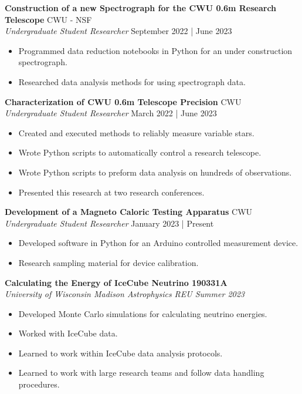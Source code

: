 \documentclass[a4paper,9pt]{extarticle}
\begin{document}
\noindent
\textbf{Construction of a new Spectrograph for the CWU 0.6m Research Telescope} \hfill CWU - NSF\\
\textit{Undergraduate Student Researcher}
\hfill September 2022 | June 2023
\begin{itemize}
    \item Programmed data reduction notebooks in Python for an under construction spectrograph.
    \item Researched data analysis methods for using spectrograph data.
\end{itemize}

\noindent
\textbf{Characterization of CWU 0.6m Telescope Precision} \hfill CWU\\
\textit{Undergraduate Student Researcher}
\hfill March 2022 | June 2023
\begin{itemize}
    \item Created and executed methods to reliably measure variable stars.
    \item Wrote Python scripts to automatically control a research telescope.
    \item Wrote Python scripts to preform data analysis on hundreds of observations.
    \item Presented this research at two research conferences.
\end{itemize}

\noindent
\textbf{Development of a Magneto Caloric Testing Apparatus} \hfill CWU\\
\textit{Undergraduate Student Researcher}
\hfill January 2023 | Present
\begin{itemize}
    \item Developed software in Python for an Arduino controlled measurement device.
    \item Research sampling material for device calibration.
\end{itemize}

\noindent
\textbf{Calculating the Energy of IceCube Neutrino 190331A}\\
\textit{University of Wisconsin Madison Astrophysics REU Summer 2023}
\begin{itemize}
    \item Developed Monte Carlo simulations for calculating neutrino energies.
    \item Worked with IceCube data.
    \item Learned to work within IceCube data analysis protocols.
    \item Learned to work with large research teams and follow data handling procedures.
\end{itemize}
\end{document}
